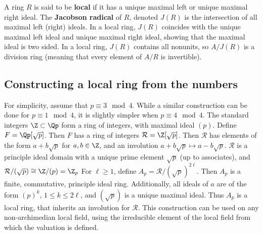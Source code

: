 \documentclass[11pt]{article}
\begin{document}
\begin{definition*}
A ring $R$ is said to be \textbf{local} if it has a unique maximal left or unique maximal right ideal.
The \textbf{Jacobson radical} of $R$, denoted $J(R)$ is the intersection of all maximal left (right) ideals.
In a local ring, $J(R)$ coincides with the unique maximal left ideal and unique maximal right ideal, showing that the maximal ideal is two sided.
In a local ring, $J(R)$ contains all nonunits, so $A/J(R)$ is a division ring (meaning that every element of $A/R$ is invertible).
\end{definition*}

\subsection*{Constructing a local ring from the \padic numbers}
\begin{example*}
For simplicity, assume that $p \equiv 3 \mod{4}$.
While a similar construction can be done for $p \equiv 1 \mod{4}$, it is slightly simpler when $p \equiv 4 \mod{4}$.
The standard integers $\Z \subset \Qp$ form a ring of integers, with maximal ideal $(p)$.
Define $F = \Qp[\sqrt{p}]$.
Then $F$ has a ring of integers $\mathcal{R} = \Z[\sqrt{p}]$.
Then $\mathcal{R}$ has elements of the form $a + b\sqrt{p}$ for $a, b \in \Z$, and an involution $a + b \sqrt{p} \mapsto a - b \sqrt{p}$.
$\mathcal{R}$ is a principle ideal domain with a unique prime element $\sqrt{p}$ (up to associates),
and $\mathcal{R} / (\sqrt{p}) \cong \Z / (p) = \Z_p$
For $\ell \ge 1$, define $A_p = \mathcal{R} / (\sqrt{p})^{2\ell}$.
Then $A_p$ is a finite, commutative, principle ideal ring.
Additionally, all ideals of $a$ are of the form $(p)^k$, $1 \le k \le 2 \ell$, and $(\sqrt{p})$ is a unique maximal ideal.
Thus $A_p$ is a local ring, that inherits an involution for $\mathcal{R}$.
This construction can be used on any non-archimedian local field, using the irreducible element of the local field from which the valuation is defined.
\end{example*}
\newpage
\end{document}
